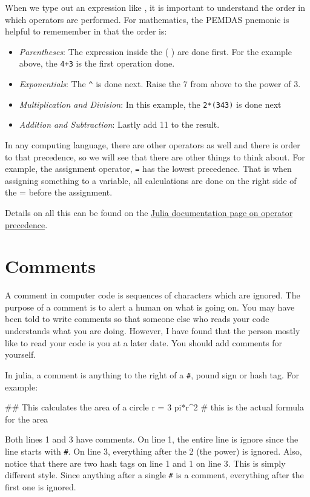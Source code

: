 When we type out an expression like , it is important to understand the order in which operators are performed. For mathematics, the PEMDAS pnemonic is helpful to rememember in that the order is:
\begin{itemize}
\item \emph{Parentheses}: The expression inside the ( ) are done first. For the example above, the \verb!4+3! is the first operation done.
\item \emph{Exponentials}: The \verb!^! is done next.  Raise the 7 from above to the power of 3. 
\item \emph{Multiplication and Division}: In this example, the \verb!2*(343)! is done next
\item \emph{Addition and Subtraction}: Lastly add 11 to the result.  
\end{itemize}

In any computing language, there are other operators as well and there is order to that precedence, so we will see that there are other things to think about. For example, the assignment operator, \verb!=! has the lowest precedence.  That is when assigning something to a variable, all calculations are done on the right side of the = before the assignment.  

Details on all this can be found on the \href{https://docs.julialang.org/en/v1/manual/mathematical-operations/index.html#Operator-Precedence-and-Associativity-1}{Julia documentation page on operator precedence}.

\section{Comments}

A comment in computer code is sequences of characters which are ignored.  The purpose of a comment is to alert a human on what is going on.  You may have been told to write comments so that someone else who reads your code understands what you are doing. However, I have found that the person mostly like to read your code is you at a later date.  You should add comments for yourself. 

In julia, a comment is anything to the right of a \verb!#!, pound sign or hash tag.  For example:

\begin{jlblock}[vars][numbers=left]
## This calculates the area of a circle
r = 3
pi*r^2 # this is the actual formula for the area
\end{jlblock}

Both lines 1 and 3 have comments.  On line 1, the entire line is ignore since the line starts with \verb!#!.  On line 3, everything after the 2 (the power) is ignored.  Also, notice that there are two hash tags on line 1 and 1 on line 3.  This is simply different style.  Since anything after a single \verb!#! is a comment, everything after the first one is ignored. 

